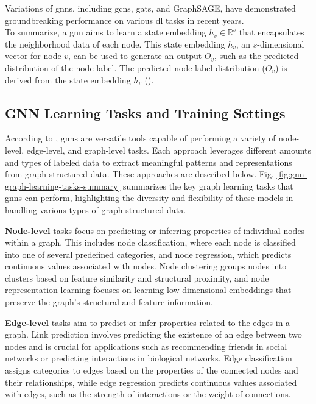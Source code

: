 Variations of \glspl{gnn}, including \glspl{gcn}, \glspl{gat}, and GraphSAGE, have demonstrated groundbreaking performance on various \gls{dl} tasks in recent years.
\\To summarize, a \gls{gnn} aims to learn a state embedding \( h_v \in \mathbb{R}^s \) that encapsulates the neighborhood data of each node.
This state embedding \( h_v \), an $s$-dimensional vector for node \( v \), can be used to generate an output \( O_v \), such as the predicted distribution of the node label.
The predicted node label distribution (\( O_v \)) is derived from the state embedding \( h_v \) (\cite{Rong2019}).

\subsection*{GNN Learning Tasks and Training Settings}
According to \cite{Zhou2020,Wu2021}, \glspl{gnn} are versatile tools capable of performing a variety of node-level, edge-level, and graph-level tasks.
Each approach leverages different amounts and types of labeled data to extract meaningful patterns and representations from graph-structured data.
These approaches are described below.
Fig. \ref{fig:gnn-graph-learning-tasks-summary} summarizes the key graph learning tasks that \glspl{gnn} can perform, highlighting the diversity and flexibility of these models in handling various types of graph-structured data.

\textbf{Node-level} tasks focus on predicting or inferring properties of individual nodes within a graph. This includes node classification, where each node is classified into one of several predefined categories, and node regression, which predicts continuous values associated with nodes.
Node clustering groups nodes into clusters based on feature similarity and structural proximity, and node representation learning focuses on learning low-dimensional embeddings that preserve the graph's structural and feature information.

\textbf{Edge-level} tasks aim to predict or infer properties related to the edges in a graph.
Link prediction involves predicting the existence of an edge between two nodes and is crucial for applications such as recommending friends in social networks or predicting interactions in biological networks.
Edge classification assigns categories to edges based on the properties of the connected nodes and their relationships, while edge regression predicts continuous values associated with edges, such as the strength of interactions or the weight of connections.

